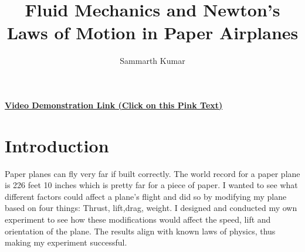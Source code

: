 \documentclass[12pt]{article}
\author{Sammarth Kumar}
\title{Fluid Mechanics and Newton's Laws of Motion in Paper Airplanes}
\begin{document}
\maketitle

\tableofcontents
\paragraph{\href{https://youtu.be/qcbdRIKSDts}{Video Demonstration Link (Click on this Pink Text)}}
\newpage
\section{Introduction}
Paper planes can fly very far if built correctly. The world record for a paper plane is 226 feet 10 inches which is pretty far for a piece of paper. I wanted to see what different factors could affect a plane's flight and did so by modifying my plane based on four things: Thrust, lift,drag, weight. I designed and conducted my own experiment to see how these modifications would affect the speed, lift and orientation of the plane. The results align with known laws of physics, thus making my experiment successful.
\end{document}
